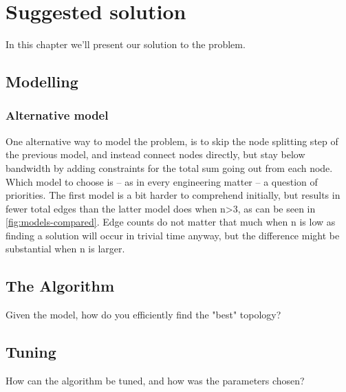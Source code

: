 \chapter{Suggested solution}
\label{chp:suggested-solution}

In this chapter we'll present our solution to the problem.

\section{Modelling}



\subsection{Alternative model}

One alternative way to model the problem, is to skip the node splitting step of the previous model, and instead connect nodes directly, but stay below bandwidth by adding constraints for the total sum going out from each node. Which model to choose is -- as in every engineering matter -- a question of priorities. The first model is a bit harder to comprehend initially, but results in fewer total edges than the latter model does when n>3, as can be seen in \autoref{fig:models-compared}. Edge counts do not matter that much when n is low as finding a solution will occur in trivial time anyway, but the difference might be substantial when n is larger. 



\section{The Algorithm}

Given the model, how do you efficiently find the "best" topology?

\section{Tuning}

How can the algorithm be tuned, and how was the parameters chosen?
